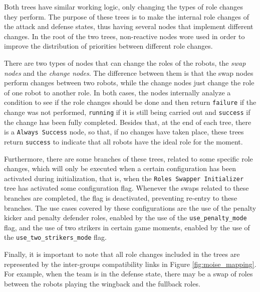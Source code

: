 Both trees have similar working logic, only changing the types of role changes they perform. The purpose of these trees is to make the internal role changes of the attack and defense states, thus having several nodes that implement different changes. In the root of the two trees, non-reactive nodes wore used in order to improve the distribution of priorities between different role changes.

There are two types of nodes that can change the roles of the robots, the \textit{swap nodes} and the \textit{change nodes}. The difference between them is that the swap nodes perform changes between two robots, while the change nodes just change the role of one robot to another role. In both cases, the nodes internally analyze a condition to see if the role changes should be done and then return \texttt{failure} if the change was not performed, \texttt{running} if it is still being carried out and \texttt{success} if the change has been fully completed. Besides that, at the end of each tree, there is a \texttt{Always Success} node, so that, if no changes have taken place, these trees return \texttt{success} to indicate that all robots have the ideal role for the moment.

Furthermore, there are some branches of these trees, related to some specific role changes, which will only be executed when a certain configuration has been activated during initialization, that is, when the \texttt{Roles Swapper Initializer} tree has activated some configuration flag. Whenever the swaps related to these branches are completed, the flag is deactivated, preventing re-entry to these branches. The use cases covered by these configurations are the use of the penalty kicker and penalty defender roles, enabled by the use of the \texttt{use\_penalty\_mode} flag, and the use of two strikers in certain game moments, enabled by the use of the \texttt{use\_two\_strikers\_mode} flag.

Finally, it is important to note that all role changes included in the trees are represented by the inter-groups compatibility links in Figure \ref{fig:moise_mapping}. For example, when the team is in the defense state, there may be a swap of roles between the robots playing the wingback and the fullback roles.
